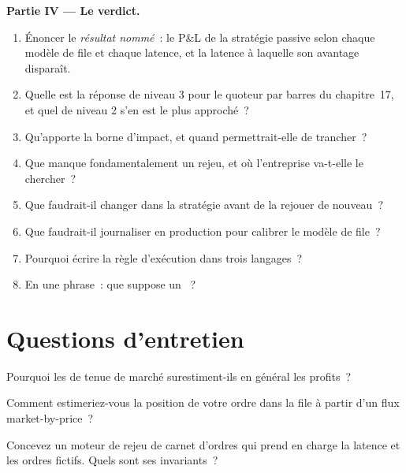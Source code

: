 \begin{problem}
\medskip\noindent\textbf{Partie IV --- Le verdict.}
\begin{enumerate}[resume]
\item Énoncer le \emph{résultat nommé}~: le P\&L de la stratégie passive selon chaque modèle de file et chaque latence, et la latence à laquelle son avantage disparaît.
\item Quelle est la réponse de niveau 3 pour le quoteur par barres du chapitre~17, et quel  de niveau 2 s'en est le plus approché~?
\item Qu'apporte la borne d'impact, et quand permettrait-elle de trancher~?
\item Que manque fondamentalement un rejeu, et où l'entreprise va-t-elle le chercher~?
\item Que faudrait-il changer dans la stratégie avant de la rejouer de nouveau~?
\item Que faudrait-il journaliser en production pour calibrer le modèle de file~?
\item Pourquoi écrire la règle d'exécution dans trois langages~?
\item En une phrase~: que suppose un ~?
\end{enumerate}
\end{problem}

\section{Questions d'entretien}

\begin{interviewq}\label{iq:rs:order-book-replay-simulation:1}
Pourquoi les  de tenue de marché surestiment-ils en général les profits~?
\end{interviewq}

\begin{interviewq}\label{iq:rs:order-book-replay-simulation:2}
Comment estimeriez-vous la position de votre ordre dans la file à partir d'un flux market-by-price~?
\end{interviewq}

\begin{interviewq}\label{iq:rs:order-book-replay-simulation:3}
Concevez un moteur de rejeu de carnet d'ordres qui prend en charge la latence et les ordres fictifs. Quels sont ses invariants~?
\end{interviewq}

